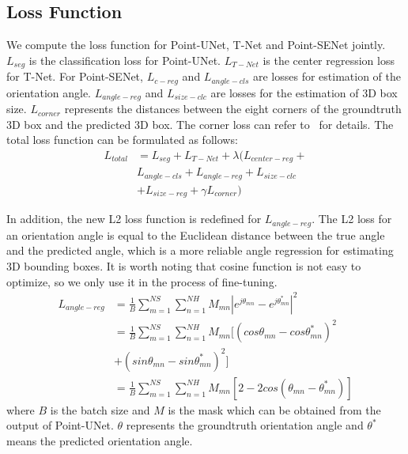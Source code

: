 \documentclass[letterpaper]{article} %
\begin{document}
\subsection{Loss Function}
We compute the loss function for Point-UNet, T-Net and Point-SENet jointly.
$L_{seg}$ is the classification loss for Point-UNet. $L_{T-Net}$ is
the center regression loss for T-Net. For Point-SENet, $L_{c-reg}$ and $L_{angle-cls}$ are losses for estimation of the orientation angle. $L_{angle-reg}$ and $L_{size-clc}$ are losses for the estimation of 3D box size. $L_{corner}$ represents the distances between the eight corners of the groundtruth 3D box and the predicted 3D box. The corner loss can refer to~\cite{qi2017frustum} for details. The total loss function can be formulated as follows:
\begin{equation}
\begin{aligned}
 L_{total} & =  L_{seg} + L_{T-Net} + \lambda (L_{center-reg}+ \\
 & L_{angle-cls}+ L_{angle-reg}+L_{size-clc} \\
  & +L_{size-reg} + \gamma L_{corner})
\end{aligned}
\end{equation}

In addition, the new L2 loss function is redefined for $L_{angle-reg}$. The L2 loss for an orientation angle is equal to the Euclidean distance between the true angle and the predicted angle, which is a more reliable angle regression for estimating 3D bounding boxes. It is worth noting that cosine function is not easy to optimize, so we only use it in the process of fine-tuning.
\begin{equation}
\begin{aligned}
L_{angle-reg} & = \frac{1}{B} \sum_{m=1}^{NS} \sum_{n=1}^{NH} {M}_{mn} |e^{j                  \theta_{mn}}-e^{j\theta_{mn}^*}|^2  \\
              & = \frac{1}{B} \sum_{m=1}^{NS} \sum_{n=1}^{NH} {M}_{mn}
              [(cos\theta_{mn}-cos{\theta_{mn}^*})^2 \\
              &+ (sin\theta_{mn}-sin{\theta_{mn}^*})^2 ]\\
              & = \frac{1}{B} \sum_{m=1}^{NS} \sum_{n=1}^{NH} {M}_{mn}[2-2cos(\theta_{mn}-\theta_{mn}^*)]
\end{aligned}
\end{equation}
 where $B$ is the batch size and $M$ is the mask which can be obtained from the output of Point-UNet. $\theta$ represents the groundtruth orientation angle and ${\theta^*}$ means the predicted orientation angle.
\end{document}
